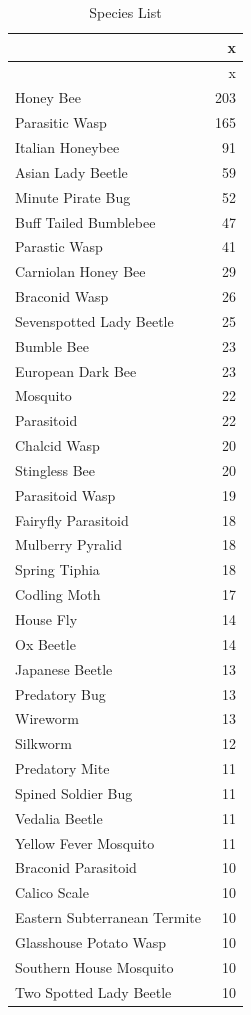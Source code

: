 \documentclass[
  12pt,
]{article}
\begin{document}
\begin{longtable}[]{@{}lr@{}}
\caption{Species List}\tabularnewline
\toprule
& x \\
\midrule
\endfirsthead
\toprule
& x \\
\midrule
\endhead
Honey Bee & 203 \\
Parasitic Wasp & 165 \\
Italian Honeybee & 91 \\
Asian Lady Beetle & 59 \\
Minute Pirate Bug & 52 \\
Buff Tailed Bumblebee & 47 \\
Parastic Wasp & 41 \\
Carniolan Honey Bee & 29 \\
Braconid Wasp & 26 \\
Sevenspotted Lady Beetle & 25 \\
Bumble Bee & 23 \\
European Dark Bee & 23 \\
Mosquito & 22 \\
Parasitoid & 22 \\
Chalcid Wasp & 20 \\
Stingless Bee & 20 \\
Parasitoid Wasp & 19 \\
Fairyfly Parasitoid & 18 \\
Mulberry Pyralid & 18 \\
Spring Tiphia & 18 \\
Codling Moth & 17 \\
House Fly & 14 \\
Ox Beetle & 14 \\
Japanese Beetle & 13 \\
Predatory Bug & 13 \\
Wireworm & 13 \\
Silkworm & 12 \\
Predatory Mite & 11 \\
Spined Soldier Bug & 11 \\
Vedalia Beetle & 11 \\
Yellow Fever Mosquito & 11 \\
Braconid Parasitoid & 10 \\
Calico Scale & 10 \\
Eastern Subterranean Termite & 10 \\
Glasshouse Potato Wasp & 10 \\
Southern House Mosquito & 10 \\
Two Spotted Lady Beetle & 10 \\

\end{longtable}
\end{document}
